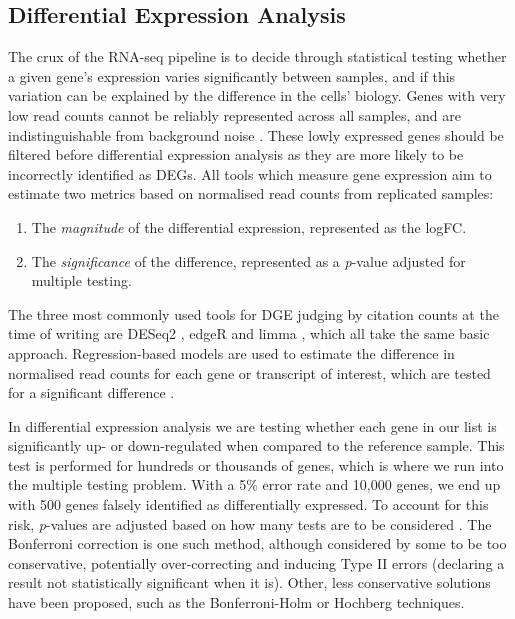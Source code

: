 \subsection{Differential Expression Analysis}
The crux of the RNA-seq pipeline is to decide through statistical testing whether a given gene's expression varies significantly between samples, and if this variation can be explained by the difference in the cells' biology. Genes with very low read counts cannot be reliably represented across all samples, and are indistinguishable from background noise \citep{mcintyre2011rna}. These lowly expressed genes should be filtered before differential expression analysis as they are more likely to be incorrectly identified as \ac{DEG}s. All tools which measure gene expression aim to estimate two metrics  based on normalised read counts from replicated samples: 

\begin{enumerate}\itemsep-0.5em
\item The \textit{magnitude} of the differential expression, represented as the \ac{logFC}.
\item The \textit{significance} of the difference, represented as a \textit{p}-value adjusted for multiple testing.
\end{enumerate} 

The three most commonly used tools for \ac{DGE} judging by citation counts at the time of writing are DESeq2 \citep{love2014moderated}, edgeR \citep{edger} and limma \citep{ritchie2015limma}, which all take the same basic approach. Regression-based models are used to estimate the difference in normalised read counts for each gene or transcript of interest, which are tested for a significant difference \citep{dundar2015introduction}.

In differential expression analysis we are testing whether each gene in our list is significantly up- or down-regulated when compared to the reference sample. This test is performed for hundreds or thousands of genes, which is where we run into the multiple testing problem. With a 5\% error rate and 10,000 genes, we end up with 500 genes falsely identified as differentially expressed. To account for this risk, \textit{p}-values are adjusted based on how many tests are to be considered \citep{feise2002multiple}. The Bonferroni correction \citep{dunn1961multiple} is one such method, although considered by some \citep{feise2002multiple} to be too conservative, potentially over-correcting and inducing Type II errors (declaring a result not statistically significant when it is). Other, less conservative solutions have been proposed, such as the Bonferroni-Holm \citep{holm1979simple} or Hochberg \citep{hochberg1987multiple} techniques.

